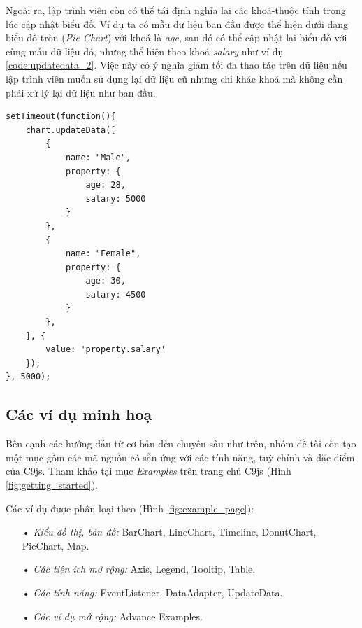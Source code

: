 \documentclass[12pt,a4paper,twoside]{article}
\begin{document}
Ngoài ra, lập trình viên còn có thể tái định nghĩa lại các khoá-thuộc tính trong lúc cập nhật biểu đồ. Ví dụ ta có mẫu dữ liệu ban đầu được thể hiện dưới dạng biểu đồ tròn (\textit{Pie Chart}) với khoá là \textit{age}, sau đó có thể cập nhật lại biểu đồ với cùng mẫu dữ liệu đó, nhưng thể hiện theo khoá \textit{salary} như ví dụ \ref{code:updatedata_2}. Việc này có ý nghĩa giảm tối đa thao tác trên dữ liệu nếu lập trình viên muốn sử dụng lại dữ liệu cũ nhưng chỉ khác khoá mà không cần phải xử lý lại dữ liệu như ban đầu.

\begin{lstlisting}[caption=Định nghĩa lại khoá-thuộc tính trong lúc cập nhật, label={code:updatedata_2}]
setTimeout(function(){
    chart.updateData([
        {
            name: "Male", 
            property: {
                age: 28,
                salary: 5000
            }
        },
        {
            name: "Female", 
            property: {
                age: 30,
                salary: 4500
            }
        },
    ], {
        value: 'property.salary'
    });
}, 5000);
\end{lstlisting}

\subsection{Các ví dụ minh hoạ}
Bên cạnh các hướng dẫn từ cơ bản đến chuyên sâu như trên, nhóm đề tài còn tạo một mục gồm các mã nguồn có sẵn ứng với các tính năng, tuỳ chỉnh và đặc điểm của C9js. Tham khảo tại mục \textit{Examples} trên trang chủ C9js (Hình \ref{fig:getting_started}). 

Các ví dụ được phân loại theo (Hình \ref{fig:example_page}):
\begin{itemize}
\item[•] \emph{Kiểu đồ thị, bản đồ:} BarChart, LineChart, Timeline, DonutChart, PieChart, Map.
\item[•] \emph{Các tiện ích mở rộng:} Axis, Legend, Tooltip, Table.
\item[•] \emph{Các tính năng:} EventListener, DataAdapter, UpdateData.
\item[•] \emph{Các ví dụ mở rộng:} Advance Examples.
\end{itemize}
\end{document}
